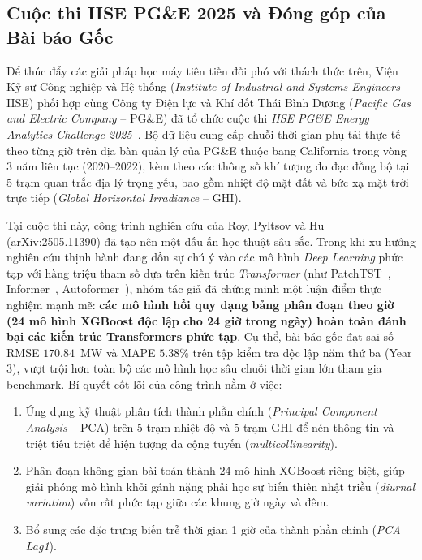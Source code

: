 \subsection{Cuộc thi IISE PG\&E 2025 và Đóng góp của Bài báo Gốc}
Để thúc đẩy các giải pháp học máy tiên tiến đối phó với thách thức trên, Viện Kỹ sư Công nghiệp và Hệ thống (\textit{Institute of Industrial and Systems Engineers} -- IISE) phối hợp cùng Công ty Điện lực và Khí đốt Thái Bình Dương (\textit{Pacific Gas and Electric Company} -- PG\&E) đã tổ chức cuộc thi \textit{IISE PG\&E Energy Analytics Challenge 2025}~\cite{pge2025zenodo}. Bộ dữ liệu cung cấp chuỗi thời gian phụ tải thực tế theo từng giờ trên địa bàn quản lý của PG\&E thuộc bang California trong vòng 3 năm liên tục (2020--2022), kèm theo các thông số khí tượng đo đạc đồng bộ tại 5 trạm quan trắc địa lý trọng yếu, bao gồm nhiệt độ mặt đất và bức xạ mặt trời trực tiếp (\textit{Global Horizontal Irradiance} -- GHI).

Tại cuộc thi này, công trình nghiên cứu của Roy, Pyltsov và Hu~\cite{roy2025hourly} (arXiv:2505.11390) đã tạo nên một dấu ấn học thuật sâu sắc. Trong khi xu hướng nghiên cứu thịnh hành đang dồn sự chú ý vào các mô hình \textit{Deep Learning} phức tạp với hàng triệu tham số dựa trên kiến trúc \textit{Transformer} (như PatchTST~\cite{nie2023time}, Informer~\cite{zhou2021informer}, Autoformer~\cite{wu2021autoformer}), nhóm tác giả đã chứng minh một luận điểm thực nghiệm mạnh mẽ: \textbf{các mô hình hồi quy dạng bảng phân đoạn theo giờ (24 mô hình XGBoost độc lập cho 24 giờ trong ngày) hoàn toàn đánh bại các kiến trúc Transformers phức tạp}. Cụ thể, bài báo gốc đạt sai số RMSE $170.84$~MW và MAPE $5.38\%$ trên tập kiểm tra độc lập năm thứ ba (Year 3), vượt trội hơn toàn bộ các mô hình học sâu chuỗi thời gian lớn tham gia benchmark. Bí quyết cốt lõi của công trình nằm ở việc:
\begin{enumerate}
    \item Ứng dụng kỹ thuật phân tích thành phần chính (\textit{Principal Component Analysis} -- PCA) trên 5 trạm nhiệt độ và 5 trạm GHI để nén thông tin và triệt tiêu triệt để hiện tượng đa cộng tuyến (\textit{multicollinearity}).
    \item Phân đoạn không gian bài toán thành 24 mô hình XGBoost riêng biệt, giúp giải phóng mô hình khỏi gánh nặng phải học sự biến thiên nhật triều (\textit{diurnal variation}) vốn rất phức tạp giữa các khung giờ ngày và đêm.
    \item Bổ sung các đặc trưng biến trễ thời gian 1 giờ của thành phần chính (\textit{PCA Lag1}).
\end{enumerate}

